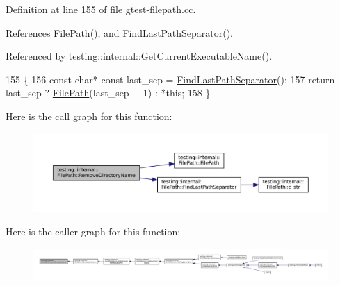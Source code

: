 Definition at line 155 of file gtest-\/filepath.\+cc.



References File\+Path(), and Find\+Last\+Path\+Separator().



Referenced by testing\+::internal\+::\+Get\+Current\+Executable\+Name().


\begin{DoxyCode}
155                                              \{
156   \textcolor{keyword}{const} \textcolor{keywordtype}{char}* \textcolor{keyword}{const} last\_sep = \hyperlink{classtesting_1_1internal_1_1FilePath_ab47f288e1e9ce5a904eccb94e86c4f99}{FindLastPathSeparator}();
157   \textcolor{keywordflow}{return} last\_sep ? \hyperlink{classtesting_1_1internal_1_1FilePath_a3504a51accbca78a52fe586133ea5499}{FilePath}(last\_sep + 1) : *this;
158 \}
\end{DoxyCode}
Here is the call graph for this function\+:
\nopagebreak
\begin{figure}[H]
\begin{center}
\leavevmode
\includegraphics[width=350pt]{classtesting_1_1internal_1_1FilePath_a6b61ede2c81ecd870b8220c04aec3060_cgraph}
\end{center}
\end{figure}
Here is the caller graph for this function\+:
\nopagebreak
\begin{figure}[H]
\begin{center}
\leavevmode
\includegraphics[width=350pt]{classtesting_1_1internal_1_1FilePath_a6b61ede2c81ecd870b8220c04aec3060_icgraph}
\end{center}
\end{figure}
\mbox{\label{classtesting_1_1internal_1_1FilePath_aab20b631705b90044d04c67205f2256f}} 
